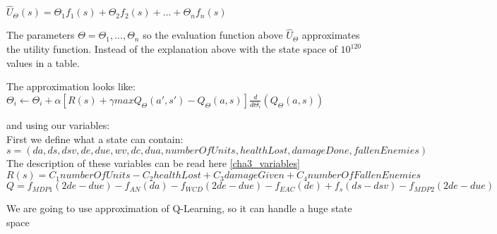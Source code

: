 $\hat{U}_\Theta(s) = \Theta_1 f_1(s) + \Theta_2 f_2(s) + ... + \Theta_n f_n(s) $

The parameters $\Theta = \Theta_1, ..., \Theta_n$ so the evaluation function above $\hat{U}_\Theta$ approximates the utility function. Instead of the explanation above with the state space of $10^{120}$ values in a table.

The approximation looks like:
$\Theta_i \leftarrow \Theta_i + \alpha [ R(s) + \gamma maxQ_\Theta(a',s')-Q_\Theta(a,s) ] \frac{d}{d\Theta_i}(Q_\Theta(a,s))$


and using our variables:\\
First we define what a state can contain:\\
$s = {(da, ds, dsv, de, due, wv, dc, dua, numberOfUnits, healthLost, damageDone, fallenEnemies)}$
The description of these variables can be read here \ref{cha3_variables}\\
$R(s) = C_1 numberOfUnits - C_2 healthLost +  C_3 damageGiven +  C_4 numberOfFallenEnemies$\\

$Q = f_{MDP1} (2de - due)-f_{AN}(da)-f_{WCD}(2de-due)-f_{EAC}(de)+f_s(ds-dsv)-f_{MDP2}(2de-due)$

We are going to use approximation of Q-Learning, so it can handle a huge state space



